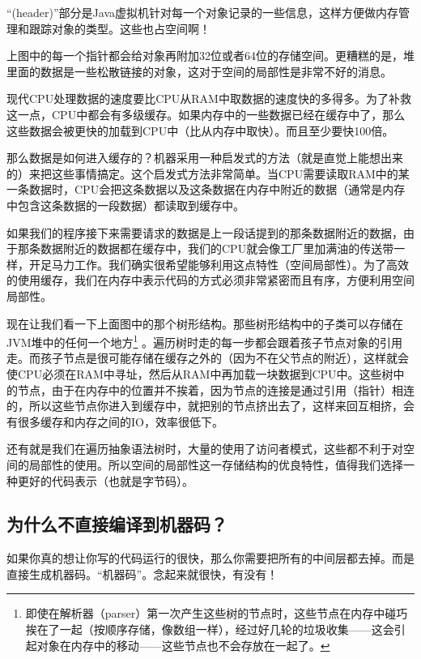 \documentclass[cn,10pt,math=newtx,citestyle=gb7714-2015,bibstyle=gb7714-2015]{elegantbook}
\begin{document}
\begin{tcolorbox}
“(header)”部分是Java虚拟机针对每一个对象记录的一些信息，这样方便做内存管理和跟踪对象的类型。这些也占空间啊！
\end{tcolorbox}

上图中的每一个指针都会给对象再附加32位或者64位的存储空间。更糟糕的是，堆里面的数据是一些松散链接的对象，这对于空间的局部性是非常不好的消息。

现代CPU处理数据的速度要比CPU从RAM中取数据的速度快的多得多。为了补救这一点，CPU中都会有多级缓存。如果内存中的一些数据已经在缓存中了，那么这些数据会被更快的加载到CPU中（比从内存中取快）。而且至少要快100倍。

那么数据是如何进入缓存的？机器采用一种启发式的方法（就是直觉上能想出来的）来把这些事情搞定。这个启发式方法非常简单。当CPU需要读取RAM中的某一条数据时，CPU会把这条数据以及这条数据在内存中附近的数据（通常是内存中包含这条数据的一段数据）都读取到缓存中。

如果我们的程序接下来需要请求的数据是上一段话提到的那条数据附近的数据，由于那条数据附近的数据都在缓存中，我们的CPU就会像工厂里加满油的传送带一样，开足马力工作。我们确实很希望能够利用这点特性（空间局部性）。为了高效的使用缓存，我们在内存中表示代码的方式必须非常紧密而且有序，方便利用空间局部性。

现在让我们看一下上面图中的那个树形结构。那些树形结构中的子类可以存储在JVM堆中的任何一个地方\footnote{即使在解析器（parser）第一次产生这些树的节点时，这些节点在内存中碰巧挨在了一起（按顺序存储，像数组一样），经过好几轮的垃圾收集——这会引起对象在内存中的移动——这些节点也不会存放在一起了。} 。遍历树时走的每一步都会跟着孩子节点对象的引用走。而孩子节点是很可能存储在缓存之外的（因为不在父节点的附近），这样就会使CPU必须在RAM中寻址，然后从RAM中再加载一块数据到CPU中。这些树中的节点，由于在内存中的位置并不挨着，因为节点的连接是通过引用（指针）相连的，所以这些节点你进入到缓存中，就把别的节点挤出去了，这样来回互相挤，会有很多缓存和内存之间的IO，效率很低下。

还有就是我们在遍历抽象语法树时，大量的使用了访问者模式，这些都不利于对空间的局部性的使用。所以空间的局部性这一存储结构的优良特性，值得我们选择一种更好的代码表示（也就是字节码）。

\subsection{为什么不直接编译到机器码？}

如果你真的想让你写的代码运行的很快，那么你需要把所有的中间层都去掉。而是直接生成机器码。“机器码”。念起来就很快，有没有！
\end{document}
